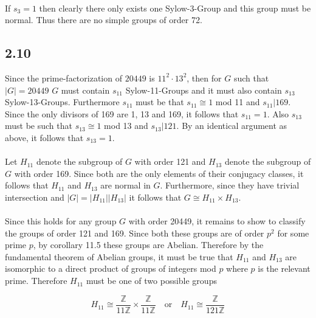 \documentclass{article}
\begin{document}
\paragraph{}
If $s_3 =1$ then clearly there only exists one Sylow-3-Group and this group must be normal. Thus 
there are no simple groups of order 72.

\subsection*{2.10}
Since the prime-factorization of $20449$ is $11^2\cdot13^2$, then for $G$ such that $|G| = 20449$ $G$ must contain $s_{11}$ Sylow-11-Groups 
and it must also contain $s_{13}$ Sylow-13-Groups. Furthermore $s_{11}$ must be that $s_{11} \cong 1$ mod 11 
and $s_{11} | 169$. Since the only divisors of 169 are 1, 13 and 169, it follows that $s_{11} = 1$. 
Also $s_{13}$ must be such that $s_{13} \cong 1$ mod 13 and $s_{13} | 121$. By an identical argument as 
above, it follows that $s_{13} = 1$.

\paragraph{}
Let $H_{11}$ denote the subgroup of $G$ with order 121 and $H_{13}$ denote the subgroup of $G$ with 
order 169. Since both are the only elements of their conjugacy classes, it follows that $H_{11}$ and 
$H_{13}$ are normal in $G$. Furthermore, since they have trivial intersection and $|G| = |H_{11}||H_{13}|$ 
it follows that $G \cong H_{11} \times H_{13}$.

\paragraph{}
Since this holds for any group $G$ with order 20449, it remains to show to classify the groups 
of order 121 and 169. Since both these groups are of order $p^2$ for some prime $p$, by corollary 
11.5 these groups are Abelian. Therefore by the fundamental theorem of Abelian groups, it must be 
true that $H_{11}$ and $H_{13}$ are isomorphic to a direct product of groups of integers mod $p$ 
where $p$ is the relevant prime. Therefore $H_{11}$ must be one of two possible groups

\begin{equation*}
    H_{11} \cong \frac{\mathbb{Z}}{11\mathbb{Z}} \times \frac{\mathbb{Z}}{11\mathbb{Z}} \quad \text{or} \quad H_{11} \cong \frac{\mathbb{Z}}{121\mathbb{Z}}
\end{equation*}
\end{document}
